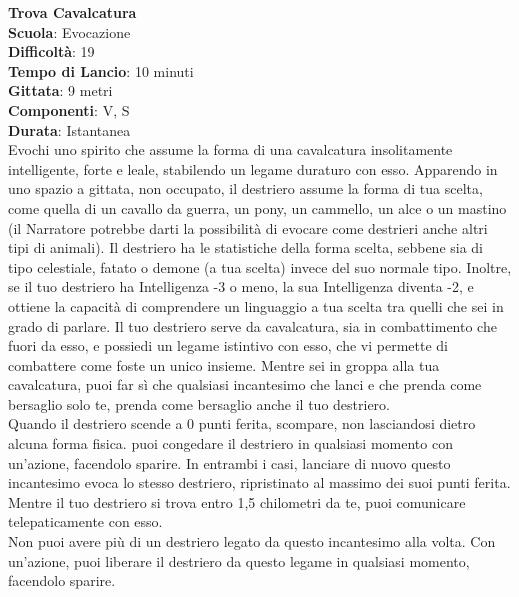 \begin{multicols}{2}
\medskip\textbf{Trova Cavalcatura}\\
\textbf{Scuola}: Evocazione\\
\textbf{Difficoltà}: 19\\
\textbf{Tempo di Lancio}: 10 minuti\\
\textbf{Gittata}: 9 metri\\
\textbf{Componenti}: V, S\\
\textbf{Durata}: Istantanea\\
Evochi uno spirito che assume la forma di una cavalcatura insolitamente intelligente, forte e leale, stabilendo un legame duraturo con esso. Apparendo in uno spazio a gittata, non occupato, il destriero assume la forma di tua scelta, come quella di un cavallo da guerra, un pony, un cammello, un alce o un mastino (il Narratore potrebbe darti la possibilità di evocare come destrieri anche altri tipi di animali). Il destriero ha le statistiche della forma scelta, sebbene sia di tipo celestiale, fatato o demone (a tua scelta) invece del suo normale tipo. Inoltre, se il tuo destriero ha Intelligenza -3 o meno, la sua Intelligenza diventa -2, e ottiene la capacità di comprendere un linguaggio a tua scelta tra quelli che sei in grado di parlare. Il tuo destriero serve da cavalcatura, sia in combattimento che fuori da esso, e possiedi un legame istintivo con esso, che vi permette di combattere come foste un unico insieme. Mentre sei in groppa alla tua cavalcatura, puoi far sì che qualsiasi incantesimo che lanci e che prenda come bersaglio solo te, prenda come bersaglio anche il tuo destriero.\\
Quando il destriero scende a 0 punti ferita, scompare, non lasciandosi dietro alcuna forma fisica. puoi congedare il destriero in qualsiasi momento con un'azione, facendolo sparire. In entrambi i casi, lanciare di nuovo questo incantesimo evoca lo stesso destriero, ripristinato al massimo dei suoi punti ferita. Mentre il tuo destriero si trova entro 1,5 chilometri da te, puoi comunicare telepaticamente con esso.\\
Non puoi avere più di un destriero legato da questo incantesimo alla volta. Con un'azione, puoi liberare il destriero da questo legame in qualsiasi momento, facendolo sparire.


\end{multicols}
